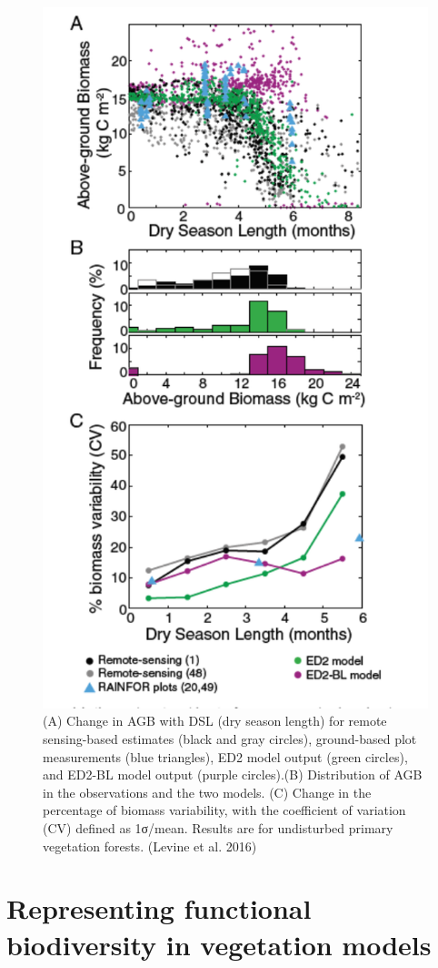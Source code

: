 \documentclass[12pt,oneside]{book}
\begin{document}
\begin{figure}

{\centering \includegraphics[width=0.8\linewidth]{figures/chap6/f638_levine2} 

}

\caption{(A) Change in AGB with DSL (dry season length) for remote sensing-based estimates (black and gray circles), ground-based plot measurements (blue triangles), ED2 model output (green circles), and ED2-BL model output (purple circles).(B) Distribution of AGB in the observations and the two models. (C) Change in the percentage of biomass variability, with the coefficient of variation (CV) defined as 1σ/mean. Results are for undisturbed primary vegetation forests. (Levine et al. 2016) }\label{fig:f638}
\end{figure}

\chapter{Representing functional biodiversity in vegetation
models}\label{representing-functional-biodiversity-in-vegetation-models}
\end{document}
